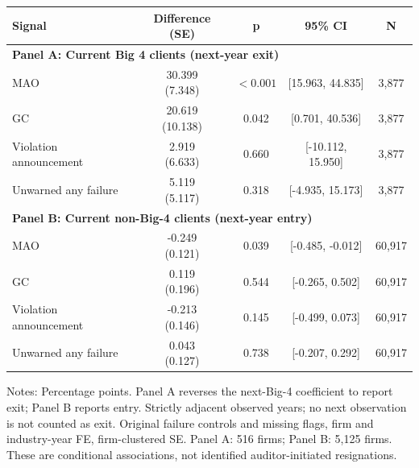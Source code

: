 \documentclass[10pt]{article}
\begin{document}
\begin{minipage}{19cm}\fontsize{10}{12}\selectfont\centering
\setlength{\tabcolsep}{4pt}\renewcommand{\arraystretch}{1.15}
\begin{tabular}{lcccc}\toprule
Signal & Difference (SE) & p & 95\% CI & N \\ \midrule
\multicolumn{5}{l}{\textbf{Panel A: Current Big 4 clients (next-year exit)}} \\
MAO & \shortstack{30.399\\(7.348)} & $<0.001$ & [15.963, 44.835] & 3,877 \\
GC & \shortstack{20.619\\(10.138)} & 0.042 & [0.701, 40.536] & 3,877 \\
Violation announcement & \shortstack{2.919\\(6.633)} & 0.660 & [-10.112, 15.950] & 3,877 \\
Unwarned any failure & \shortstack{5.119\\(5.117)} & 0.318 & [-4.935, 15.173] & 3,877 \\
\multicolumn{5}{l}{\textbf{Panel B: Current non-Big-4 clients (next-year entry)}} \\
MAO & \shortstack{-0.249\\(0.121)} & 0.039 & [-0.485, -0.012] & 60,917 \\
GC & \shortstack{0.119\\(0.196)} & 0.544 & [-0.265, 0.502] & 60,917 \\
Violation announcement & \shortstack{-0.213\\(0.146)} & 0.145 & [-0.499, 0.073] & 60,917 \\
Unwarned any failure & \shortstack{0.043\\(0.127)} & 0.738 & [-0.207, 0.292] & 60,917 \\
\bottomrule\end{tabular}\par\smallskip\raggedright\fontsize{9}{11}\selectfont Notes: Percentage points. Panel A reverses the next-Big-4 coefficient to report exit; Panel B reports entry. Strictly adjacent observed years; no next observation is not counted as exit. Original failure controls and missing flags, firm and industry-year FE, firm-clustered SE. Panel A: 516 firms; Panel B: 5,125 firms. These are conditional associations, not identified auditor-initiated resignations.
\end{minipage}
\end{document}
